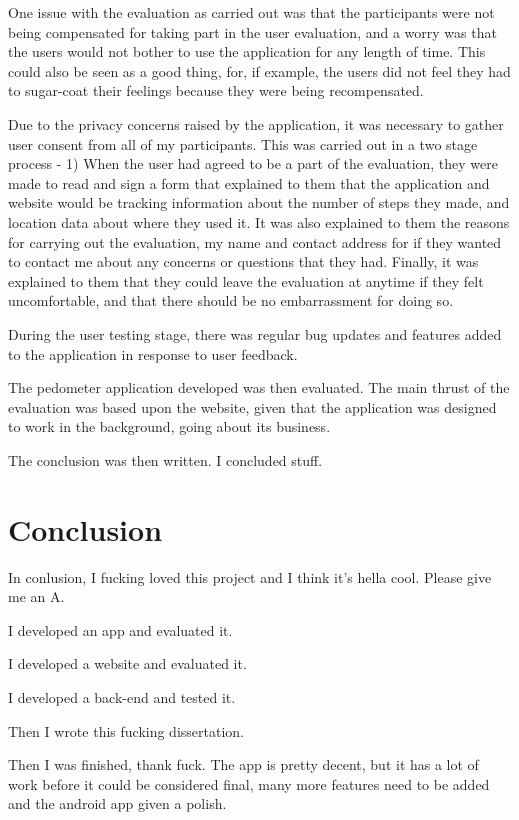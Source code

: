 \documentclass{l4proj}
\begin{document}
One issue with the evaluation as carried out was that the participants were not being compensated for taking part in the user evaluation, and a worry was that the users would not bother to use the application for any length of time. This could also be seen as a good thing, for, if example, the users did not feel they had to sugar-coat their feelings because they were being recompensated.
 
Due to the privacy concerns raised by the application, it was necessary to gather user consent from all of my participants. This was carried out in a two stage process - 1) When the user had agreed to be a part of the evaluation, they were made to read and sign a form that explained to them that the application and website would be tracking information about the number of steps they made, and location data about where they used it. It was also explained to them the reasons for carrying out the evaluation, my name and contact address for if they wanted to contact me about any concerns or questions that they had. Finally, it was explained to them that they could leave the evaluation at anytime if they felt uncomfortable, and that there should be no embarrassment for doing so.

During the user testing stage, there was regular bug updates and features added to the application in response to user feedback.

The pedometer application developed was then evaluated. The main thrust of the evaluation was based upon the website, given that the application was designed to work in the background, going about its business.

The conclusion was then written. I concluded stuff. 


\chapter{Conclusion}

In conlusion, I fucking loved this project and I think it's hella cool. Please give me an A.

I developed an app and evaluated it.

I developed a website and evaluated it.

I developed a back-end and tested it.

Then I wrote this fucking dissertation.

Then I was finished, thank fuck. The app is pretty decent, but it has a lot of work before it could be considered final, many more features need to be added and the android app given a polish.
\end{document}
